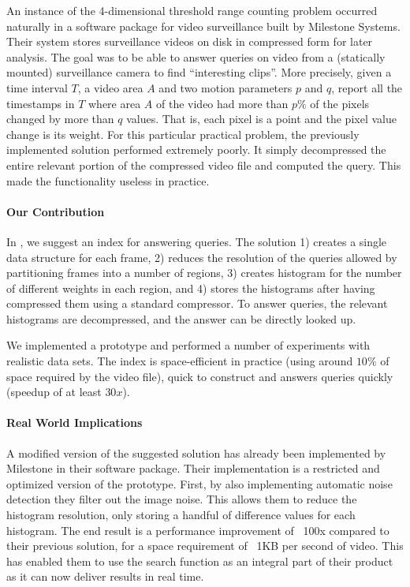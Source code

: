 An instance of the 4-dimensional threshold range counting problem occurred naturally in a software package for video surveillance built by Milestone Systems. Their system stores surveillance videos on disk in compressed form for later analysis. The goal was to be able to answer  queries on video from a (statically mounted) surveillance camera to find ``interesting clips''. More precisely, given a time interval $T$, a video area $A$ and two motion parameters $p$ and $q$, report all the timestamps in $T$ where area $A$ of the video had more than $p\%$ of the pixels changed by more than $q$ values. That is, each pixel is a point and the pixel value change is its weight.
For this particular practical problem, the previously implemented solution performed extremely poorly. It simply decompressed the entire relevant portion of the compressed video file and computed the query. This made the functionality useless in practice. 

\paragraph{Our Contribution} 
In , we suggest an index for answering  queries. The solution 1) creates a single data structure for each frame, 2) reduces the resolution of the queries allowed by partitioning frames into a number of regions, 3) creates histogram for the number of different weights in each region, and 4) stores the histograms after having compressed them using a standard compressor. To answer queries, the relevant histograms are decompressed, and the answer can be directly looked up.

We implemented a prototype and performed a number of experiments with realistic data sets. The index is space-efficient in practice (using around $10\%$ of space required by the video file), quick to construct and answers queries quickly (speedup of at least $30x$). 

\paragraph{Real World Implications} 
A modified version of the suggested solution has already been implemented by Milestone in their software package. Their implementation is a restricted and optimized version of the prototype. First, by also implementing automatic noise detection they filter out the image noise. This allows them to reduce the histogram resolution, only storing a handful of difference values for each histogram. The end result is a performance improvement of ~100x compared to their previous solution, for a space requirement of ~1KB per second of video. This has enabled them to use the search function as an integral part of their product as it can now deliver results in real time.


